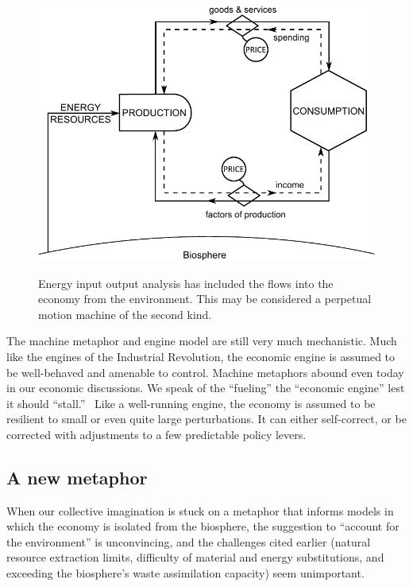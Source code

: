 \begin{figure}[!ht]
\centering\
\includegraphics[width=\linewidth]{Part_0/Chapter_Introduction/images/Perpetual_motion_2.pdf}
\caption[The traditional model supplemented with energy inputs]{Energy input output 
analysis has included the flows into the economy from the environment.
This may be considered a perpetual motion machine 
of the second kind.}
\label{fig:perp_motion_2}
\end{figure}

The machine metaphor and engine model are still very much
mechanistic.
Much like the engines of the Industrial Revolution,
the economic engine is assumed to be well-behaved and amenable to control.
Machine metaphors abound even today in our economic discussions.
We speak of the ``fueling'' the ``economic engine'' 
lest it should ``stall.''~\cite{Liu2012}
Like a well-running engine, the economy is assumed 
to be resilient to small or even quite large perturbations.  
It can either self-correct, 
or be corrected with adjustments to
a few predictable policy levers. 


\subsection{A new metaphor}
\label{sec:new_metaphor}

When our collective imagination is stuck on a metaphor that 
informs models in which the economy is isolated from the biosphere,
the suggestion to ``account for the environment'' is unconvincing, and 
the challenges cited earlier (natural resource extraction limits,
difficulty of material and energy substitutions, and 
exceeding the biosphere's waste assimilation capacity)
seem unimportant. 

